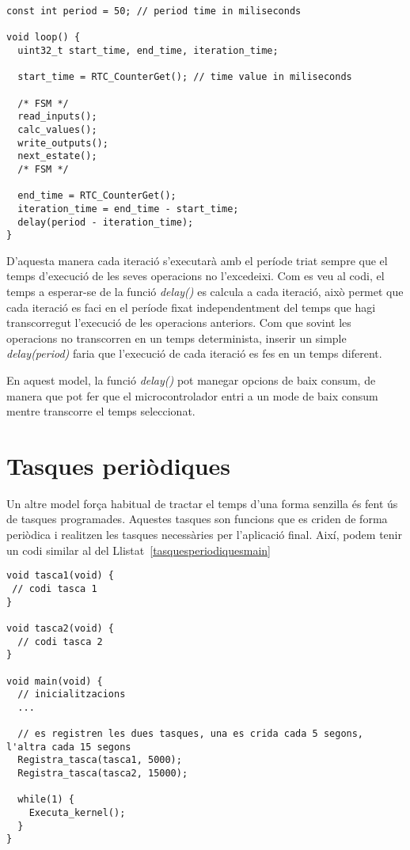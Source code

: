 \begin{lstlisting}[style=customc,caption={FSM amb control del temps},label=FSM_temps]
const int period = 50; // period time in miliseconds

void loop() {
  uint32_t start_time, end_time, iteration_time;
  
  start_time = RTC_CounterGet(); // time value in miliseconds
  
  /* FSM */
  read_inputs();
  calc_values();
  write_outputs();
  next_estate();
  /* FSM */
  
  end_time = RTC_CounterGet();
  iteration_time = end_time - start_time;
  delay(period - iteration_time);
}
\end{lstlisting}

D'aquesta manera cada iteració s'executarà amb el període triat sempre que el temps d'execució de les seves operacions no l'excedeixi. Com es veu al codi, el temps a esperar-se de la funció {\em delay()} es calcula a cada iteració, això permet que cada iteració es faci en el període fixat independentment del temps que hagi transcorregut l'execució de les operacions anteriors. Com que sovint les operacions no transcorren en un temps determinista, inserir un simple {\em delay(period)} faria que l'execució de cada iteració es fes en un temps diferent.

En aquest model, la funció {\em delay()} pot manegar opcions de baix consum, de manera que pot fer que el microcontrolador entri a un mode de baix consum mentre transcorre el temps seleccionat.

\section{Tasques periòdiques}
\label{sec:tasquesperiodiques}

Un altre model força habitual de tractar el temps d'una forma senzilla és fent ús de tasques programades. Aquestes tasques son funcions que es criden de forma periòdica i realitzen les tasques necessàries per l'aplicació final. Així, podem tenir un codi similar al del Llistat~\ref{tasquesperiodiquesmain}

\begin{lstlisting}[style=customc,caption={Estructura bàsica de les tasques programades},label=tasquesperiodiquesmain]
void tasca1(void) {
 // codi tasca 1
}

void tasca2(void) {
  // codi tasca 2
}

void main(void) {
  // inicialitzacions
  ...
  
  // es registren les dues tasques, una es crida cada 5 segons, l'altra cada 15 segons
  Registra_tasca(tasca1, 5000);
  Registra_tasca(tasca2, 15000);

  while(1) {
    Executa_kernel();
  }
}
\end{lstlisting}

